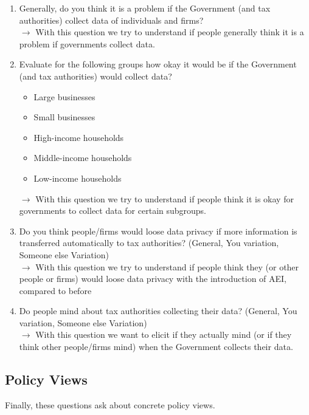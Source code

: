 \documentclass[12pt]{article}
\begin{document}
\begin{enumerate}
\begin{itemize}
        \item Small businesses
        \item High-income households
        \item Middle-income households
        \item Low-income households
    \end{itemize} $\rightarrow$ This question aims to understand in which subgroups AEI could help tax administartors.
    \item Generally, do you think it is a problem if the Government (and tax authorities) collect data of individuals and firms? \\ $\rightarrow$ With this question we try to understand if people generally think it is a problem if governments collect data.
    \item Evaluate for the following groups how okay it would be if the Government (and tax authorities) would collect data?
        \begin{itemize}
        \item Large businesses
        \item Small businesses
        \item High-income households
        \item Middle-income households
        \item Low-income households
    \end{itemize} $\rightarrow$ With this question we try to understand if people think it is okay for governments to collect data for certain subgroups.
    \item Do you think people/firms would loose data privacy if more information is transferred automatically to tax authorities? (General, You variation, Someone else Variation) \\ $\rightarrow$ With this question we try to understand if people think they (or other people or firms) would loose data privacy with the introduction of AEI, compared to before
    \item Do people mind about tax authorities collecting their data? (General, You variation, Someone else Variation) \\ $\rightarrow$ With this question we want to elicit if they actually mind (or if they think other people/firms mind) when the Government collects their data. 
\end{enumerate} 

\subsection{Policy Views}
Finally, these questions ask about concrete policy views. 
\end{document}
